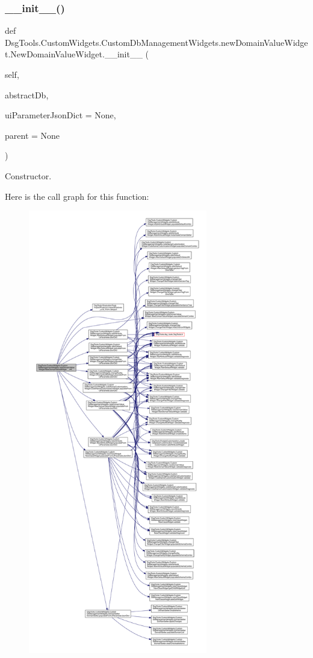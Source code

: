 \subsubsection{\texorpdfstring{\+\_\+\+\_\+init\+\_\+\+\_\+()}{\_\_init\_\_()}}
{\footnotesize\ttfamily def Dsg\+Tools.\+Custom\+Widgets.\+Custom\+Db\+Management\+Widgets.\+new\+Domain\+Value\+Widget.\+New\+Domain\+Value\+Widget.\+\_\+\+\_\+init\+\_\+\+\_\+ (\begin{DoxyParamCaption}\item[{}]{self,  }\item[{}]{abstract\+Db,  }\item[{}]{ui\+Parameter\+Json\+Dict = {\ttfamily None},  }\item[{}]{parent = {\ttfamily None} }\end{DoxyParamCaption})}

\begin{DoxyVerb}Constructor.\end{DoxyVerb}
 Here is the call graph for this function\+:
\nopagebreak
\begin{figure}[H]
\begin{center}
\leavevmode
\includegraphics[height=550pt]{class_dsg_tools_1_1_custom_widgets_1_1_custom_db_management_widgets_1_1new_domain_value_widget_1_1_new_domain_value_widget_a539b34dde334fc0e949534763a0ca580_cgraph}
\end{center}
\end{figure}



